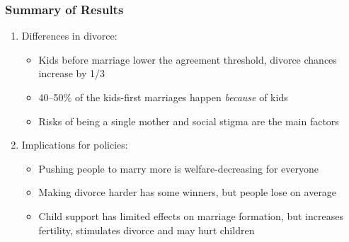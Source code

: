 \documentclass[aspectratio=169]{beamer}
\let\olditem\item
\renewcommand{\item}{%
\olditem\vspace{\fill}}
\begin{document}
\begin{frame}
\frametitle{Summary of Results}
\begin{enumerate}
\item Differences in divorce:
\begin{itemize}
\item Kids before marriage lower the agreement threshold, divorce chances increase by 1/3
\item 40--50\% of the kids-first marriages happen \emph{because} of kids
\item Risks of being a single mother and social stigma are the main factors
\end{itemize}
\item Implications for policies:
\begin{itemize}
\item Pushing people to marry more is welfare-decreasing for everyone
\item Making divorce harder has some winners, but people lose on average
\item Child support has limited effects on marriage formation, but increases fertility, stimulates divorce and may hurt children
\end{itemize}
\end{enumerate}
\end{frame}
\end{document}
